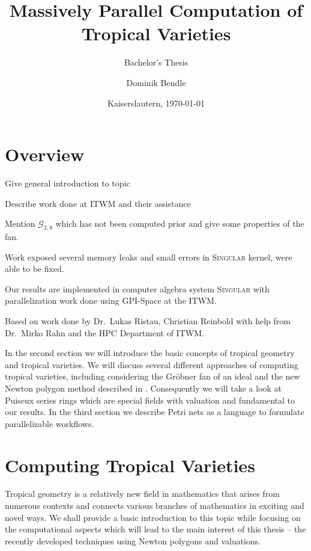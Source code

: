 \documentclass[
  paper=a4,
  titlepage,
  bibliography=totoc,
  listof=totoc,
  pagesize=pdftex
]{scrartcl}
\subtitle{Bachelor's Thesis}
\title{Massively Parallel Computation of Tropical Varieties}
\author{Dominik Bendle}
\date{Kaiserslautern, \today}
\numberwithin{figure}{section}
\numberwithin{equation}{section}
\numberwithin{table}{section}
\theoremstyle{definition}
\numberwithin{definition}{section}
\begin{document}
\pagestyle{headings}

\maketitle

\tableofcontents
\newpage

\section{Overview}

Give general introduction to topic

Describe work done at ITWM and their assistance

Mention $\mathcal G_{3,8}$ which has not been computed prior and give some properties of the
fan.

Work exposed several memory leaks and small errors in \textsc{Singular} kernel, were able
to be fixed.

Our results are implemented in computer algebra system \textsc{Singular} \cite{Singular}
with parallelization work done using GPI-Space at the ITWM.

Based on work done by Dr.\ Lukas Ristau, Christian Reinbold with help from Dr.\ Mirko Rahn
and the HPC Department of ITWM.


In the second section we will introduce the basic concepts of tropical geometry and
tropical varieties. We will discuss several different approaches of computing tropical
varieties, including considering the Gröbner fan of an ideal and the new Newton polygon
method described in \cite{tropPointsLinks}. Consequently we will take a look at Puiseux
series rings which are special fields with valuation and fundamental to our results. In
the third section we describe Petri nets as a language to formulate parallelizable
workflows.


\section{Computing Tropical Varieties}

Tropical geometry is a relatively new field in mathematics that arises from numerous
contexts and connects various branches of mathematics in exciting and novel ways. We shall
provide a basic introduction to this topic while focusing on the computational aspects
which will lead to the main interest of this thesis -- the recently developed techniques
using Newton polygons and valuations.
\end{document}
